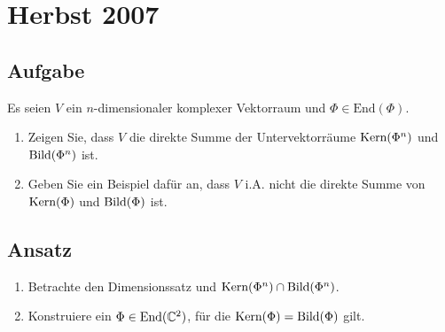 \newpage

\section{Herbst 2007}

\subsection{Aufgabe}
Es seien \( V \) ein \( n \)-dimensionaler komplexer Vektorraum und \( \Phi \in \text{End}(\Phi) \).
\begin{enumerate}
	\item Zeigen Sie, dass \( V \) die direkte Summe der Untervektorräume \( \text{Kern}(\Phi^n) \) und \( \text{Bild}(\Phi^n) \) ist. 
	\item Geben Sie ein Beispiel dafür an, dass \( V \) i.A. nicht die direkte Summe von \( \text{Kern}(\Phi) \) und \( \text{Bild}(\Phi) \) ist.
\end{enumerate}

\subsection{Ansatz}
\begin{enumerate}
	\item Betrachte den Dimensionssatz und \( \text{Kern}(\Phi^n) \cap \text{Bild}(\Phi^n) \).
	\item Konstruiere ein \( \Phi \in \text{End}(\mathbb{C}^2) \), für die \( \text{Kern}(\Phi) = \text{Bild}(\Phi) \) gilt. 
\end{enumerate}


